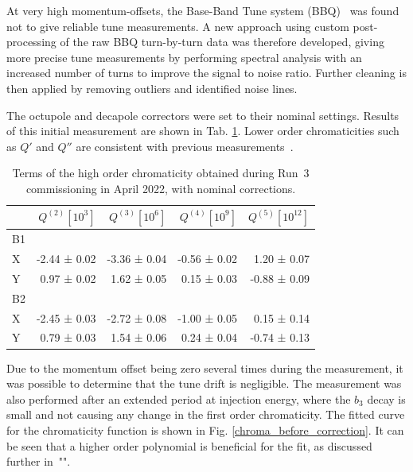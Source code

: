 At very high momentum-offsets, the Base-Band Tune system (BBQ)~\cite{gasior_principle_2005, boccardi_first_2009}
was found not to give reliable tune measurements. A new approach using custom post-processing of the raw BBQ 
turn-by-turn data was therefore developed, giving more precise tune measurements by performing
spectral analysis with an increased number of turns to improve the signal to noise ratio. Further cleaning is
then applied by removing outliers and identified noise lines.

The octupole and decapole correctors were set to their nominal settings.
Results of this initial measurement are shown in Tab. \ref{chroma_fidel}. Lower order chromaticities such as
$Q'$ and $Q''$ are consistent with previous measurements~\cite{maclean_commissioning_2016}.

\begin{table}[tbh]
    \centering
    \small
    \setlength{\tabcolsep}{4.2pt}
    \begin{tabular}{|l||r|r|r|r|}
    \hline
                  & $Q^{(2)} [10^3]$ & $Q^{(3)} [10^6]$ & $Q^{(4)} [10^9]$ & $Q^{(5)} [10^{12}]$ \\ \hline\hline
        B1        &              &               &              & \\
        X         & -2.44 ± 0.02 & -3.36 ± 0.04 & -0.56 ± 0.02  &  1.20 ± 0.07 \\
        Y         &  0.97 ± 0.02 &  1.62 ± 0.05  &  0.15 ± 0.03 & -0.88 ± 0.09 \\ \hline
        B2        &              &               &              & \\
        X         & -2.45 ± 0.03 & -2.72 ± 0.08 & -1.00 ± 0.05  &  0.15 ± 0.14 \\
        Y         &  0.79 ± 0.03 & 1.54 ± 0.06  &  0.24 ± 0.04  & -0.74 ± 0.13 \\ \hline
    \end{tabular}
    \caption{Terms of the high order chromaticity obtained during Run~3 commissioning in April 2022, with nominal corrections.}
    \label{chroma_fidel}
\end{table}

Due to the momentum offset being zero several times during the measurement, it was possible to determine that
the tune drift is negligible. The measurement was also performed after an extended period at injection
energy, where the $b_3$ decay is small and not causing any change in the first order chromaticity.
The fitted curve for the chromaticity function is shown in Fig. \ref{chroma_before_correction}.
It can be seen that a higher order polynomial is beneficial for the fit, as discussed further in~"".


